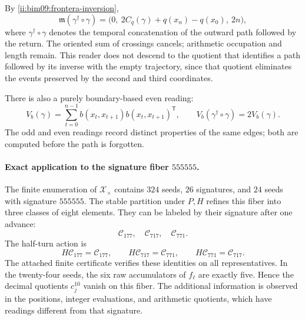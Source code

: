 By \eqref{ii:bim09:frontera-inversion},
\begin{equation}
 \mathfrak m(\gamma^\dagger\circ\gamma)=
 \bigl(0,\ 2C_q(\gamma)+q(x_n)-q(x_0),\ 2n\bigr),
 \label{ii:bim09:memoria-retorno}
\end{equation}
where $\gamma^\dagger\circ\gamma$ denotes the temporal concatenation
of the outward path followed by the return. The oriented sum of crossings cancels;
arithmetic occupation and length remain. This reader does not
descend to the quotient that identifies a path followed by its inverse
with the empty trajectory, since that quotient eliminates the events
preserved by the second and third coordinates.

There is also a purely boundary-based even reading:
\[
 V_b(\gamma)=\sum_{t=0}^{n-1}
 b(x_t,x_{t+1})b(x_t,x_{t+1})^{\mathsf T},\qquad
 V_b(\gamma^\dagger\circ\gamma)=2V_b(\gamma).
\]
The odd and even readings record distinct properties of
the same edges; both are computed before the path is forgotten.

\paragraph{Exact application to the signature fiber \texorpdfstring{$555555$}{555555}.}

The finite enumeration of $\mathscr X_\times$ contains $324$ seeds,
$26$ signatures, and $24$ seeds with signature $555555$. The stable
partition under $P,H$ refines this fiber into three classes of eight elements.
They can be labeled by their signature after one advance:
\[
 \mathscr C_{177},\quad\mathscr C_{717},\quad\mathscr C_{771}.
\]
The half-turn action is
\[
 H\mathscr C_{177}=\mathscr C_{177},\qquad
 H\mathscr C_{717}=\mathscr C_{771},\qquad
 H\mathscr C_{771}=\mathscr C_{717}.
\]
The attached finite certificate verifies these identities on all
representatives. In the twenty-four seeds, the six raw accumulators
of $f_\ell$ are exactly five. Hence the decimal quotients
$c_j^{10}$ vanish on this fiber. The additional information
is observed in the positions, integer evaluations, and arithmetic
quotients, which have readings different from that signature.

